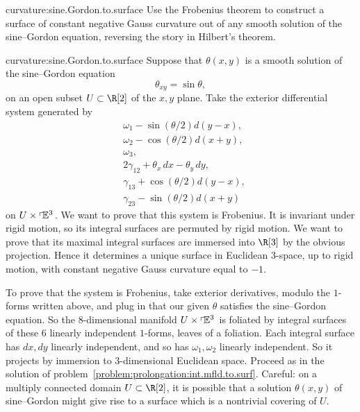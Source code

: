 \begin{problem}{curvature:sine.Gordon.to.surface}
Use the Frobenius theorem to construct a surface of constant negative Gauss curvature out of any smooth solution of the sine--Gordon equation, reversing the story in Hilbert's theorem.
\end{problem}
\begin{answer}{curvature:sine.Gordon.to.surface}
Suppose that \(\theta(x,y)\) is a smooth solution of the sine--Gordon equation 
\[
\theta_{xy}=\sin \theta,
\]
on an open subset \(U\subset\R[2]\) of the \(x,y\) plane.
Take the exterior differential system generated by
\begin{align*}
&\omega_1-\sin(\theta/2)d(y-x),\\
&\omega_2-\cos(\theta/2)d(x+y),\\
&\omega_3,\\
&2\gamma_{12}+\theta_x\,dx-\theta_y\,dy,\\
&\gamma_{13}+\cos(\theta/2)d(y-x),\\
&\gamma_{23}-\sin(\theta/2)d(x+y)
\end{align*}
on \(U\times\left\ulcorner\!\mathbb{E}^{3}\right.\).
We want to prove that this system is Frobenius.
It is invariant under rigid motion, so its integral surfaces are permuted by rigid motion.
We want to prove that its maximal integral surfaces are immersed into \(\R[3]\) by the obvious projection.
Hence it determines a unique surface in Euclidean \(3\)-space, up to rigid motion, with constant negative Gauss curvature equal to \(-1\).

To prove that the system is Frobenius, take exterior derivatives, modulo the \(1\)-forms written above, and plug in that our given \(\theta\) satisfies the sine--Gordon equation.
So the \(8\)-dimensional manifold \(U\times\left\ulcorner\!\mathbb{E}^{3}\right.\) is foliated by integral surfaces of these \(6\) linearly independent \(1\)-forms, leaves of a foliation.
Each integral surface has \(dx,dy\) linearly independent, and so has \(\omega_1,\omega_2\) linearly independent.
So it projects by immersion to \(3\)-dimensional Euclidean space.
Proceed as in the solution of problem~\vref{problem:prolongation:int.mfld.to.surf}.
Careful: on a multiply connected domain \(U\subset\R[2]\), it is possible that a solution \(\theta(x,y)\) of sine--Gordon might give rise to a surface which is a nontrivial covering of \(U\).
\end{answer}
